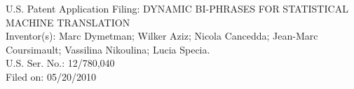 \begin{description}
\item U.S. Patent Application Filing: DYNAMIC BI-PHRASES FOR STATISTICAL MACHINE TRANSLATION  \\
Inventor(s): Marc Dymetman; Wilker Aziz; Nicola Cancedda; Jean-Marc Coursimault;  Vassilina Nikoulina; Lucia Specia. \\
U.S. Ser. No.:  12/780,040 \\
Filed on: 05/20/2010  \\
\end{description}